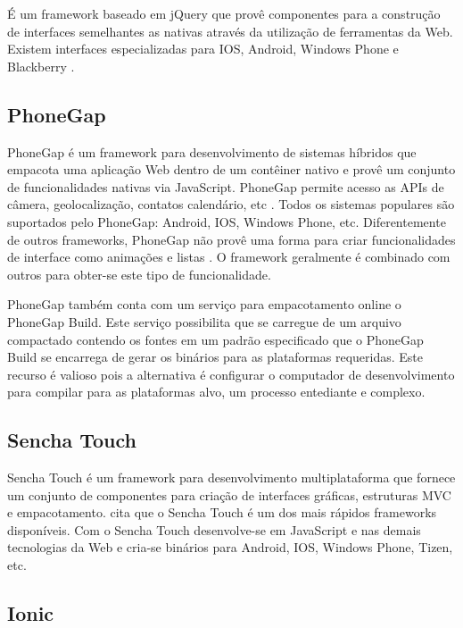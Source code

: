 É um framework baseado em jQuery que provê componentes para a
construção de interfaces semelhantes as nativas através da
utilização de ferramentas da Web. Existem interfaces especializadas
para IOS, Android, Windows Phone e Blackberry \autocite{kendoui}.

\subsection{PhoneGap}

PhoneGap é um framework para desenvolvimento de sistemas híbridos que
empacota uma aplicação Web dentro de um contêiner nativo e provê um
conjunto de funcionalidades nativas via JavaScript. PhoneGap permite
acesso as APIs de câmera, geolocalização, contatos calendário,
etc \autocite[p. 3]{crossPlatformAppsAnimations}. Todos os sistemas
populares são suportados pelo PhoneGap: Android, IOS, Windows Phone,
etc. Diferentemente de outros frameworks, PhoneGap não provê uma
forma para criar funcionalidades de interface como animações e listas
\autocite[p. 15]{viabilityBusinessApplications}. O framework 
geralmente é combinado com outros para obter-se este tipo de funcionalidade.

PhoneGap também conta com um serviço para empacotamento online o
PhoneGap Build. Este serviço possibilita que se carregue de um arquivo
compactado contendo os fontes em um padrão especificado que o PhoneGap
Build se encarrega de gerar os binários para as plataformas requeridas.
Este recurso é valioso pois a alternativa é configurar o computador
de desenvolvimento para compilar para as plataformas alvo, um processo
entediante e complexo.

\subsection{Sencha Touch}

Sencha Touch é um framework para desenvolvimento multiplataforma
que fornece um conjunto de componentes para criação de
interfaces gráficas, estruturas MVC e empacotamento. \citet[p.
14]{viabilityBusinessApplications} cita que o Sencha Touch é um dos
mais rápidos frameworks disponíveis. Com o Sencha Touch desenvolve-se
em JavaScript e nas demais tecnologias da Web e cria-se binários para
Android, IOS, Windows Phone, Tizen, etc.

\subsection{Ionic}

